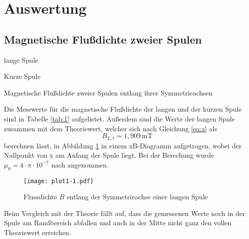 \section{Auswertung}
\label{sec:Auswertung}
\subsection{Magnetische Flußdichte zweier Spulen}
 \begin{table}[H]
  \centering
    \begin{subtable}{.4\linewidth}
      \centering
  \caption{lange Spule}
    \end{subtable} 
    \begin{subtable}{.4\linewidth}
      \centering
  
  \caption{Kurze Spule}
 
    \end{subtable} 
        \caption{Magnetische Flußdichte zweier Spulen entlang ihrer Symmetrieachsen}
    \label{tab:1}
\end{table}


\noindent Die Messwerte für die magnetische Flußdichte der 
langen und der kurzen Spule sind in Tabelle \ref{tab:1} aufgelistet.
Außerdem sind die Werte der langen Spule zusammen mit
dem Theoriewert, welcher sich nach Gleichung \ref{eq:a} als
\begin{equation}
  B_{L,t}=1,909\,\si{\milli\tesla}\nonumber
\end{equation}
berechnen lässt, in Abbildung \ref{fig:a} in einem
xB-Diagramm aufgetragen, wobei der Nullpunkt
von x am Anfang der Spule liegt. Bei der Berechung wurde $\mu_0=4 \cdot \pi \cdot 10^{-7}$ nach \cite{sample} angenommen.

\begin{figure}[H]
\centering
  \texttt{[image: plot1-1.pdf]}
  \caption{Flussdichte $B$ entlang der Symmetrieachse einer langen Spule}
  \label{fig:a}
\end{figure}
\noindent Beim Vergleich mit der Theorie fällt auf, dass
die gemessenen Werte noch in der Spule am Randbereich
abfallen und auch in der Mitte nicht ganz den vollen
Theoriewert erreichen.


